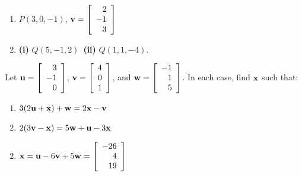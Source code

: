 \begin{multicols}{2}
\begin{ex}
\begin{enumerate}[label={\alph*.}]
\item 
$P(3,0,-1)$, $\textbf{v} = \left[
\begin{array}{r}
2\\
-1\\
3
\end{array}
\right]$


\end{enumerate}
\begin{sol}
\begin{enumerate}[label={\alph*.}]
\setcounter{enumi}{1}
\item  \textbf{(i)} $Q(5, -1, 2)$~\textbf{(ii)} $Q(1, 1, -4)$.

\end{enumerate}
\end{sol}
\end{ex}

\begin{ex}
Let 
$\textbf{u} = \left[
\begin{array}{r}
	3\\
	-1\\
	0
\end{array}
\right]$,
$\textbf{v} = \left[
\begin{array}{r}
4\\
0\\
1
\end{array}
\right]$, and 
$\textbf{w} = \left[
\begin{array}{r}
-1\\
1\\
5
\end{array}
\right]$. In each case, find $\textbf{x}$ such that:


\begin{enumerate}[label={\alph*.}]
\item $3(2\textbf{u} + \textbf{x}) + \textbf{w} = 2\textbf{x} - \textbf{v}$

\item $2(3\textbf{v} - \textbf{x}) = 5\textbf{w} + \textbf{u} - 3\textbf{x}$

\end{enumerate}
\begin{sol}
\begin{enumerate}[label={\alph*.}]
\setcounter{enumi}{1}
\item $\textbf{x} = \textbf{u} - 6\textbf{v} + 5\textbf{w} = 
\left[
\begin{array}{r}
-26\\
4\\
19
\end{array}
\right]$


\end{enumerate}
\end{sol}
\end{ex}
\end{multicols}
